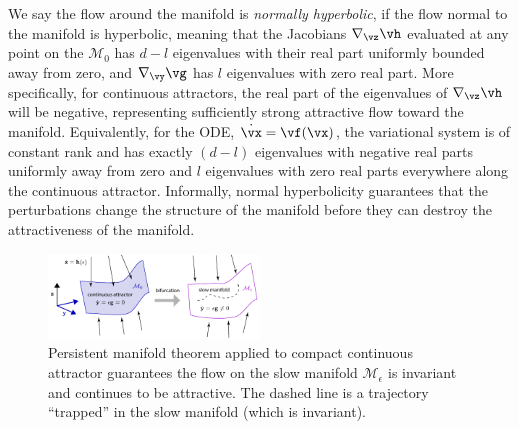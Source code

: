 \documentclass{article} %
\newcounter{ct}
\newcommand{\manifold}{\mathcal{M}}
\theoremstyle{definition}
\theoremstyle{remark}
\begin{document}
We say the flow around the manifold is \emph{normally hyperbolic}, if the flow normal to the manifold is hyperbolic, meaning that the Jacobians \(\nabla_\vz \vh\) evaluated at any point on the \(\manifold_0\) has \(d-l\) eigenvalues with their real part uniformly bounded away from zero, and \(\nabla_\vy \vg\) has \(l\) eigenvalues with zero real part.
More specifically, for continuous attractors, the real part of the eigenvalues of \(\nabla_\vz \vh\) will be negative, representing sufficiently strong attractive flow toward the manifold.
Equivalently, for the ODE, \(\dot{\vx} = \vf(\vx)\), the variational system is of constant rank and has exactly \((d-l)\) eigenvalues with negative real parts uniformly away from zero and \(l\) eigenvalues with zero real parts everywhere along the continuous attractor.
Informally, normal hyperbolicity guarantees that the perturbations change the structure of the manifold before they can destroy the attractiveness of the manifold.

\setlength\belowcaptionskip{-5ex}
\begin{figure}
  \centering
  \includegraphics[width=0.5\textwidth]{FenichelThm}
  \caption{
    Persistent manifold theorem applied to compact continuous attractor guarantees the flow on the slow manifold \(\manifold_\epsilon\) is invariant and continues to be attractive.
    The dashed line is a trajectory ``trapped'' in the slow manifold (which is invariant). %
  }\label{fig:fenichel}
\end{figure}
\end{document}
